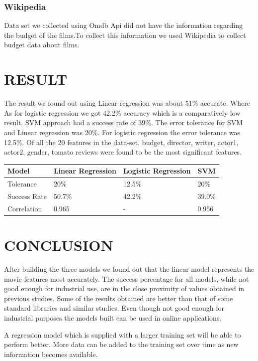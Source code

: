 \subsection {Wikipedia}
Data set we collected using Omdb Api did not have the information regarding the budget of the films.To collect this information we used Wikipedia to collect budget data about films.
\clearpage


\chapter{RESULT}
The result we found out using Linear regression was about 51\% accurate. Where As for logistic regression we got 42.2\% accuracy which is a comparatively low result. SVM approach had a success rate of 39\%. The error tolerance for SVM and Linear regression was 20\%. For logistic regression the error tolerance was 12.5\%. Of all the 20 features in the data-set, budget, director, writer, actor1, actor2, gender, tomato reviews were found to be the most significant features.

\begin{center}
    \begin{tabular}{ | l | l | l | p{5cm} |}
    \hline
    Model & Linear Regression & Logistic Regression & SVM \\ \hline
    Tolerance & 20\% & 12.5\% & 20\% \\ \hline
    Success Rate & 50.7\% & 42.2\% & 39.0\% \\ \hline
    Correlation & 0.965 & - & 0.956 \\ \hline
    \end{tabular}
\end{center}



\chapter{CONCLUSION}
After building the three models we found out that the linear model represents the movie features most accurately. The success percentage for all models, while not good enough for industrial use, are in the close proximity of values obtained in previous studies. Some of the results obtained are better than that of some standard libraries and similar studies. Even though not good enough for industrial purposes the models built can be used in online applications.


A regression model which is supplied with a larger training set will be able to perform better. More data can be added to the training set over time as new information becomes available.

